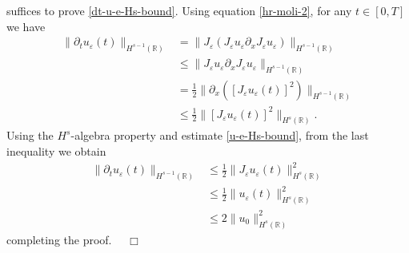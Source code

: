 \documentclass[12pt,reqno]{amsart}
\newcommand{\rr}{\mathbb{R}}
\newcommand{\p}{\partial}
\newcommand{\ee}{\varepsilon}
\theoremstyle{plain}  %
\theoremstyle{definition}
\begin{document}
 suffices to prove  \eqref{dt-u-e-Hs-bound}.
	Using equation \eqref{hr-moli-2}, for any $t\in [0, T]$ we have
	\begin{equation*}
		\begin{split}
			\| \partial_t u_\varepsilon(t) \|_{H^{s-1}(\rr)}  
			& = 
			\| J_\ee(J_\ee u_\ee \partial_x  J_\ee  u_\ee)\|_{H^{s-1}(\rr)}
			\\
			& \le  
			\| J_\ee u_\ee \partial_x  J_\ee  u_\ee \|_{H^{s-1}(\rr)}
			\\
			& =\frac{1}{2}\|\p_x([J_\varepsilon u_\varepsilon (t)]^2)\|_{H^{s-1}(\rr)}
			\\
			& \le \frac{1}{2}\|[J_\varepsilon u_\varepsilon (t)]^2\|_{H^s(\rr)}.
			\end{split}
		\end{equation*}
		Using the  $H^s$-algebra property and estimate \eqref{u-e-Hs-bound},
		from the last inequality we obtain
		\begin{equation}
			\label{deriv1}
			\begin{split}
				\| \partial_t u_\varepsilon(t) \|_{H^{s-1}(\rr)}  
				& \le
				\frac{1}{2}\|J_\varepsilon u_\varepsilon (t)\|_{H^s(\rr)}^2
				\\
				&\le
				\frac{1}{2} \| u_\varepsilon (t)\|_{H^s(\rr)}^2
				\\
				&\le
				2 \|u_0\|_{H^s(\rr)}^2
			\end{split}
		\end{equation}
		completing the proof. $\quad \Box$
		
\end{document}
